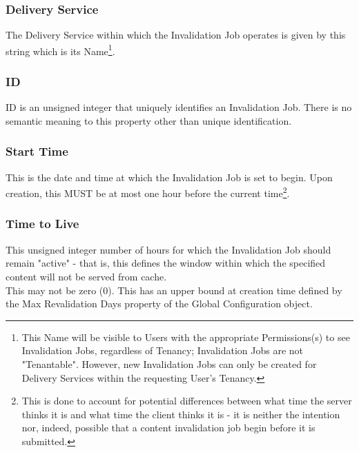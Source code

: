 \subsubsection{Delivery Service}
The Delivery Service within which the Invalidation Job operates is given by this
string which is its Name\footnote{This Name will be visible to Users with the
appropriate Permissions(s) to see Invalidation Jobs, regardless of Tenancy;
Invalidation Jobs are not "Tenantable". However, new Invalidation Jobs can only
be created for Delivery Services within the requesting User's Tenancy.}.

\subsubsection{ID}
ID is an unsigned integer that uniquely identifies an Invalidation Job. There is
no semantic meaning to this property other than unique identification.

\subsubsection{Start Time}
This is the date and time at which the Invalidation Job is set to begin. Upon
creation, this MUST be at most one hour before the current time\footnote{This is
done to account for potential differences between what time the server thinks it
is and what time the client thinks it is - it is neither the intention nor,
indeed, possible that a content invalidation job begin before it is submitted.}.

\subsubsection{Time to Live}
This unsigned integer number of hours for which the Invalidation Job should
remain "active" - that is, this defines the window within which the specified
content will not be served from cache.\\
This may not be zero ($0$). This has an upper bound at creation time defined by
the Max Revalidation Days property of the Global Configuration object.
